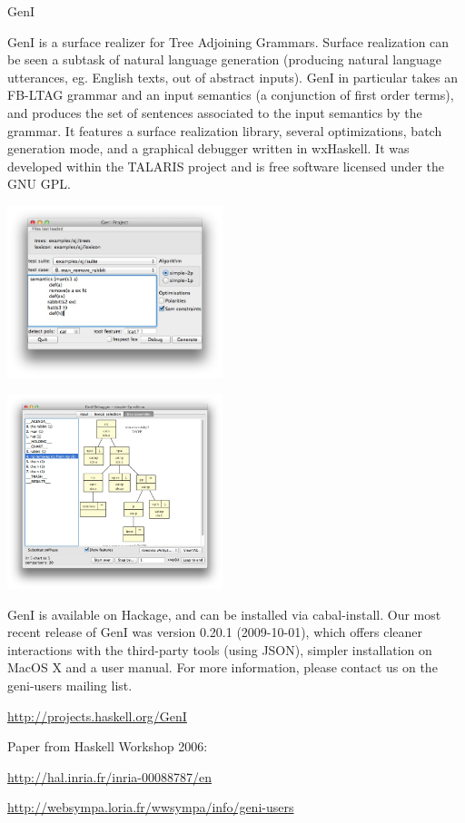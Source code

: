 \begin{hcarentry}[updated]{GenI}
\label{geni}
\makeheader

GenI is a surface realizer for Tree Adjoining Grammars.  Surface
realization can be seen a subtask of natural language generation
(producing natural language utterances, eg. English texts, out of
abstract inputs).  GenI in particular takes an FB-LTAG grammar and an
input semantics (a conjunction of first order terms), and produces the
set of sentences associated to the input semantics by the grammar.  It
features a surface realization library, several optimizations, batch
generation mode, and a graphical debugger written in wxHaskell.  It was
developed within the TALARIS project and is free software licensed under
the GNU GPL.

\begin{center}
\includegraphics[width=0.47\textwidth]{html/GenI-main-screenshot.jpg}
\end{center}

\begin{center}
\includegraphics[width=0.47\textwidth]{html/GenI-debugger-screenshot.jpg}
\end{center}

GenI is available on Hackage, and can be installed via cabal-install.
Our most recent release of GenI was version 0.20.1 (2009-10-01), which
offers cleaner interactions with the third-party tools (using JSON),
simpler installation on MacOS X and a user manual.  For more
information, please contact us on the geni-users mailing list.

\FurtherReading
\begin{compactitem}
\item \url{http://projects.haskell.org/GenI}
\item Paper from Haskell Workshop 2006:

\url{http://hal.inria.fr/inria-00088787/en}
\item \url{http://websympa.loria.fr/wwsympa/info/geni-users}
\end{compactitem}
\end{hcarentry}
